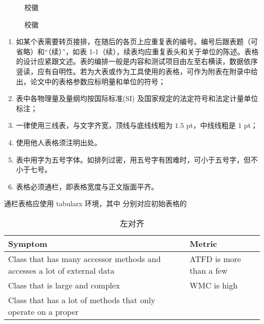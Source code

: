 \begin{texcodeonly}[]{}
  \begin{figure}[h]
    \subfigg    \subfigg
    \subfigg    \subfigg
    \subfigg    \subfigg
    \caption{校徽}
  \end{figure}
\end{texcodeonly}

\begin{figure}[h]
  \subfigg    \subfigg
  \subfigg    \subfigg
  \subfigg    \subfigg
  \caption{校徽}
\end{figure}


\clearpage


\begin{tcolorbox}[colback=red!5!white,colframe=red!75!black]
  \begin{enumerate}[leftmargin=0.5cm]
    \item 如某个表需要转页接排，在随后的各页上应重复表的编号。编号后跟表题（可省略）和“（续）”，如表 1-1（续），续表均应重复表头和关于单位的陈述。表格的设计应紧跟文述。表的编排一般是内容和测试项目由左至右横读，数据依序竖读，应有自明性。若为大表或作为工具使用的表格，可作为附表在附录中给出，论文中的表格参数应标明量和单位的符号；
    \item 表中各物理量及量纲均按国际标准(SI) 及国家规定的法定符号和法定计量单位标注；
    \item 一律使用三线表，与文字齐宽，顶线与底线线粗为 $1.5$ pt，中线线粗是 $1$ pt；
    \item 使用他人表格须注明出处。
    \item 表中用字为五号字体。如排列过密，用五号字有困难时，可小于五号字，但不小于七号。
    \item 表格必须通栏，即表格宽度与正文版面平齐。
  \end{enumerate}
\end{tcolorbox}




通栏表格应使用 tabularx 环境，其中  分别对应初始表格的 

\begin{texcode}[]{}
  \begin{table}[H]
    \caption{左对齐}
    \begin{tabularx}{\textwidth}{XX}
    \toprule
        \textbf{Symptom} & \textbf{Metric} \\
    \midrule
        Class that has many accessor methods and accesses a lot of external data & ATFD is more than a few\\
        Class that is large and complex & WMC is high \\
        Class that has a lot of methods that only operate on a proper & \\
    \bottomrule
    \end{tabularx}
  \end{table}
\end{texcode}


